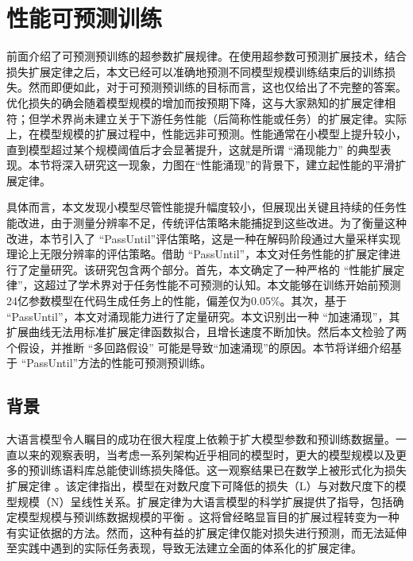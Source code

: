 


\section{性能可预测训练}

前面介绍了可预测预训练的超参数扩展规律。在使用超参数可预测扩展技术，结合损失扩展定律之后，本文已经可以准确地预测不同模型规模训练结束后的训练损失。然而即便如此，对于可预测预训练的目标而言，这也仅给出了不完整的答案。优化损失的确会随着模型规模的增加而按预期下降，这与大家熟知的扩展定律相符；但学术界尚未建立关于下游任务性能（后简称性能或任务）的扩展定律。实际上，在模型规模的扩展过程中，性能远非可预测。性能通常在小模型上提升较小，直到模型超过某个规模阈值后才会显著提升，这就是所谓 “涌现能力” 的典型表现。本节将深入研究这一现象，力图在“性能涌现”的背景下，建立起性能的平滑扩展定律。

具体而言，本文发现小模型尽管性能提升幅度较小，但展现出关键且持续的任务性能改进，由于测量分辨率不足，传统评估策略未能捕捉到这些改进。为了衡量这种改进，本节引入了 “PassUntil”评估策略，这是一种在解码阶段通过大量采样实现理论上无限分辨率的评估策略。借助 “PassUntil”，本文对任务性能的扩展定律进行了定量研究。该研究包含两个部分。首先，本文确定了一种严格的 “性能扩展定律”，这超过了学术界对于任务性能不可预测的认知。本文能够在训练开始前预测24亿参数模型在代码生成任务上的性能，偏差仅为0.05\%。其次，基于 “PassUntil”，本文对涌现能力进行了定量研究。本文识别出一种 “加速涌现”，其扩展曲线无法用标准扩展定律函数拟合，且增长速度不断加快。然后本文检验了两个假设，并推断 “多回路假设” 可能是导致“加速涌现”的原因。本节将详细介绍基于 “PassUntil”方法的性能可预测预训练。

\subsection{背景}

大语言模型令人瞩目的成功在很大程度上依赖于扩大模型参数和预训练数据量。一直以来的观察表明，当考虑一系列架构近乎相同的模型时，更大的模型规模以及更多的预训练语料库总能使训练损失降低。这一观察结果已在数学上被形式化为损失扩展定律 \citep{kaplan2020scaling, henighan2020scaling}。该定律指出，模型在对数尺度下可降低的损失（L）与对数尺度下的模型规模（N）呈线性关系。扩展定律为大语言模型的科学扩展提供了指导，包括确定模型规模与预训练数据规模的平衡 \citep{hoffmann2022training, muennighoff2023scaling}。这将曾经略显盲目的扩展过程转变为一种有实证依据的方法。然而，这种有益的扩展定律仅能对损失进行预测，而无法延伸至实践中遇到的实际任务表现\cite{ganguli2022predictability}，导致无法建立全面的体系化的扩展定律。


